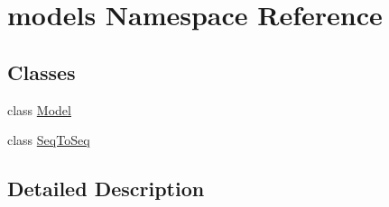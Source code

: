 \hypertarget{namespacemodels}{}\section{models Namespace Reference}
\label{namespacemodels}
\subsection*{Classes}
\begin{DoxyCompactItemize}
\item 
class \hyperlink{classmodels_1_1Model}{Model}
\item 
class \hyperlink{classmodels_1_1SeqToSeq}{Seq\+To\+Seq}
\end{DoxyCompactItemize}


\subsection{Detailed Description}
\begin{DoxyVerb}\end{DoxyVerb}
 